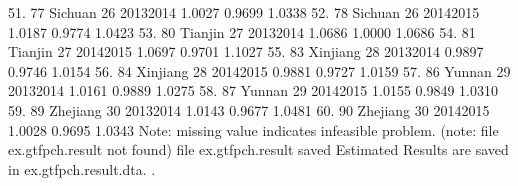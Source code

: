  51. {\VBAR}  77        Sichuan   26   2013{\tytilde}2014   1.0027   0.9699   1.0338 {\VBAR}
 52. {\VBAR}  78        Sichuan   26   2014{\tytilde}2015   1.0187   0.9774   1.0423 {\VBAR}
 53. {\VBAR}  80        Tianjin   27   2013{\tytilde}2014   1.0686   1.0000   1.0686 {\VBAR}
 54. {\VBAR}  81        Tianjin   27   2014{\tytilde}2015   1.0697   0.9701   1.1027 {\VBAR}
 55. {\VBAR}  83       Xinjiang   28   2013{\tytilde}2014   0.9897   0.9746   1.0154 {\VBAR}
 56. {\VBAR}  84       Xinjiang   28   2014{\tytilde}2015   0.9881   0.9727   1.0159 {\VBAR}
 57. {\VBAR}  86         Yunnan   29   2013{\tytilde}2014   1.0161   0.9889   1.0275 {\VBAR}
 58. {\VBAR}  87         Yunnan   29   2014{\tytilde}2015   1.0155   0.9849   1.0310 {\VBAR}
 59. {\VBAR}  89       Zhejiang   30   2013{\tytilde}2014   1.0143   0.9677   1.0481 {\VBAR}
 60. {\VBAR}  90       Zhejiang   30   2014{\tytilde}2015   1.0028   0.9695   1.0343 {\VBAR}
     {\BLC}
Note: missing value indicates infeasible problem.
(note: file ex.gtfpch.result not found)
file ex.gtfpch.result saved
{\smallskip}
Estimated Results are saved in ex.gtfpch.result.dta.
{\smallskip}
. 
